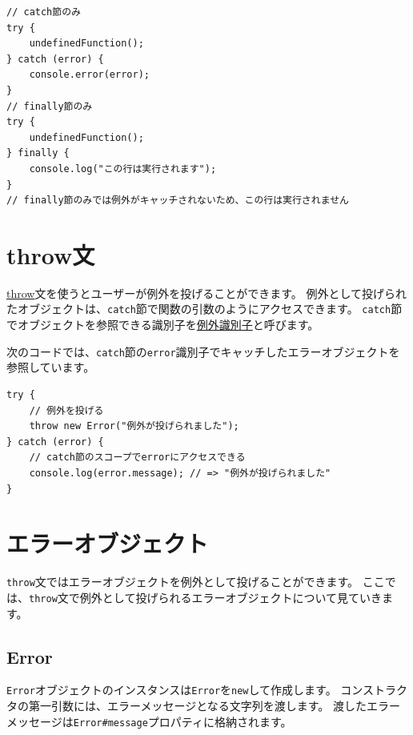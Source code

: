 \begin{lstlisting}
// catch節のみ
try {
    undefinedFunction();
} catch (error) {
    console.error(error);
}
// finally節のみ
try {
    undefinedFunction();
} finally {
    console.log("この行は実行されます");
}
// finally節のみでは例外がキャッチされないため、この行は実行されません
\end{lstlisting}

\hypertarget{throw}{%
\section{throw文}\label{throw}}

\href{https://developer.mozilla.org/ja/docs/Web/JavaScript/Reference/Statements/throw}{throw}文を使うとユーザーが例外を投げることができます。
例外として投げられたオブジェクトは、\texttt{catch}節で関数の引数のようにアクセスできます。
\texttt{catch}節でオブジェクトを参照できる識別子を\href{https://developer.mozilla.org/ja/docs/Web/JavaScript/Reference/Statements/try...catch\#The_exception_identifier}{例外識別子}と呼びます。

次のコードでは、\texttt{catch}節の\texttt{error}識別子でキャッチしたエラーオブジェクトを参照しています。

\begin{lstlisting}
try {
    // 例外を投げる
    throw new Error("例外が投げられました");
} catch (error) {
    // catch節のスコープでerrorにアクセスできる
    console.log(error.message); // => "例外が投げられました"
}
\end{lstlisting}

\hypertarget{error-object}{%
\section{エラーオブジェクト}\label{error-object}}

\texttt{throw}文ではエラーオブジェクトを例外として投げることができます。
ここでは、\texttt{throw}文で例外として投げられるエラーオブジェクトについて見ていきます。

\hypertarget{error}{%
\subsection{Error}\label{error}}

\texttt{Error}オブジェクトのインスタンスは\texttt{Error}を\texttt{new}して作成します。
コンストラクタの第一引数には、エラーメッセージとなる文字列を渡します。
渡したエラーメッセージは\texttt{Error\#message}プロパティに格納されます。

